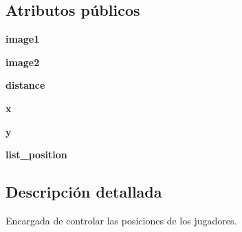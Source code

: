 \subsection*{\-Atributos públicos}
\begin{DoxyCompactItemize}
\item 
\hypertarget{classengine_1_1gamecontrol_1_1PositionBoard_a19604a40bde4f6ac5d07ec201ff76290}{
{\bfseries image1}}
\label{classengine_1_1gamecontrol_1_1PositionBoard_a19604a40bde4f6ac5d07ec201ff76290}

\item 
\hypertarget{classengine_1_1gamecontrol_1_1PositionBoard_a9db5cc895a1f3343cc4157d1662b21ea}{
{\bfseries image2}}
\label{classengine_1_1gamecontrol_1_1PositionBoard_a9db5cc895a1f3343cc4157d1662b21ea}

\item 
\hypertarget{classengine_1_1gamecontrol_1_1PositionBoard_a68a882b0967e949d1fb14d79fa49ba3f}{
{\bfseries distance}}
\label{classengine_1_1gamecontrol_1_1PositionBoard_a68a882b0967e949d1fb14d79fa49ba3f}

\item 
\hypertarget{classengine_1_1gamecontrol_1_1PositionBoard_a8d8288e298d66b3a5313c14bc6c3b991}{
{\bfseries x}}
\label{classengine_1_1gamecontrol_1_1PositionBoard_a8d8288e298d66b3a5313c14bc6c3b991}

\item 
\hypertarget{classengine_1_1gamecontrol_1_1PositionBoard_a7d32c80cbdeb908c89ebdc51c072d012}{
{\bfseries y}}
\label{classengine_1_1gamecontrol_1_1PositionBoard_a7d32c80cbdeb908c89ebdc51c072d012}

\item 
\hypertarget{classengine_1_1gamecontrol_1_1PositionBoard_ae5d61f229b0863b3222025e981538774}{
{\bfseries list\-\_\-position}}
\label{classengine_1_1gamecontrol_1_1PositionBoard_ae5d61f229b0863b3222025e981538774}

\end{DoxyCompactItemize}


\subsection{\-Descripción detallada}
\-Encargada de controlar las posiciones de los jugadores. 

